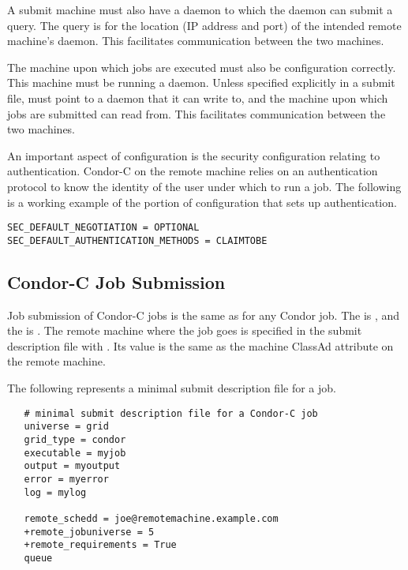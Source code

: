 A submit machine must also have a  daemon to which the
 daemon can submit a query.
The query is for the location (IP address and port)
of the intended remote machine's  daemon.
This facilitates communication between the two machines.

The machine upon which jobs are executed 
must also be configuration correctly.
This machine must be running a  daemon.
Unless specified explicitly in a submit file, 
 must point to a 
 daemon that it can write to,
and the machine upon which jobs are submitted can read from.
This facilitates communication between the two machines.

An important aspect of configuration is the security 
configuration relating to authentication.
Condor-C on the remote machine relies on an
authentication protocol to
know the identity of the user under which to run a job.
The following is a working example
of the portion of configuration that sets up authentication.

\footnotesize
\begin{verbatim}
SEC_DEFAULT_NEGOTIATION = OPTIONAL
SEC_DEFAULT_AUTHENTICATION_METHODS = CLAIMTOBE
\end{verbatim}
\normalsize


\subsection{\label{sec:Condor-C-Submit}Condor-C Job Submission}
Job submission of Condor-C jobs is the same as for any Condor job.
The  is ,
and the  is . 
The remote machine where the job goes is specified in
the submit description file with .
Its value is the same as the machine ClassAd attribute
 on the remote machine.

The following represents a minimal submit description file for
a job.

\footnotesize
\begin{verbatim}
   # minimal submit description file for a Condor-C job
   universe = grid
   grid_type = condor
   executable = myjob
   output = myoutput
   error = myerror
   log = mylog

   remote_schedd = joe@remotemachine.example.com
   +remote_jobuniverse = 5
   +remote_requirements = True
   queue
\end{verbatim}
\normalsize

